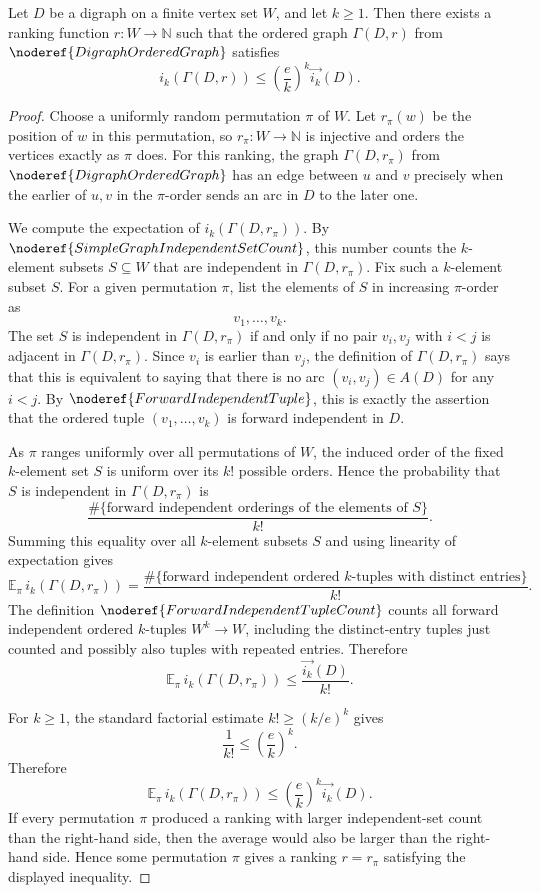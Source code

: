 \begin{helper}
Let \(D\) be a digraph on a finite vertex set \(W\), and let \(k\ge1\). Then there exists a ranking function \(r:W\to\mathbb N\) such that the ordered graph \(\Gamma(D,r)\) from \(\noderef{DigraphOrderedGraph}\) satisfies
\[
  i_k(\Gamma(D,r))
  \le
  \left(\frac e k\right)^k\overrightarrow{i_k}(D).
\]
\end{helper}
\begin{proof}
Choose a uniformly random permutation \(\pi\) of \(W\). Let \(r_\pi(w)\) be the position of \(w\) in this permutation, so \(r_\pi:W\to\mathbb N\) is injective and orders the vertices exactly as \(\pi\) does. For this ranking, the graph \(\Gamma(D,r_\pi)\) from \(\noderef{DigraphOrderedGraph}\) has an edge between \(u\) and \(v\) precisely when the earlier of \(u,v\) in the \(\pi\)-order sends an arc in \(D\) to the later one.

We compute the expectation of \(i_k(\Gamma(D,r_\pi))\). By \(\noderef{SimpleGraphIndependentSetCount}\), this number counts the \(k\)-element subsets \(S\subseteq W\) that are independent in \(\Gamma(D,r_\pi)\). Fix such a \(k\)-element subset \(S\). For a given permutation \(\pi\), list the elements of \(S\) in increasing \(\pi\)-order as
\[
  v_1,\ldots,v_k.
\]
The set \(S\) is independent in \(\Gamma(D,r_\pi)\) if and only if no pair \(v_i,v_j\) with \(i<j\) is adjacent in \(\Gamma(D,r_\pi)\). Since \(v_i\) is earlier than \(v_j\), the definition of \(\Gamma(D,r_\pi)\) says that this is equivalent to saying that there is no arc \((v_i,v_j)\in A(D)\) for any \(i<j\). By \(\noderef{ForwardIndependentTuple}\), this is exactly the assertion that the ordered tuple \((v_1,\ldots,v_k)\) is forward independent in \(D\).

As \(\pi\) ranges uniformly over all permutations of \(W\), the induced order of the fixed \(k\)-element set \(S\) is uniform over its \(k!\) possible orders. Hence the probability that \(S\) is independent in \(\Gamma(D,r_\pi)\) is
\[
  \frac{\#\{\text{forward independent orderings of the elements of }S\}}{k!}.
\]
Summing this equality over all \(k\)-element subsets \(S\) and using linearity of expectation gives
\[
  \mathbb E_\pi\, i_k(\Gamma(D,r_\pi))
  =
  \frac{\#\{\text{forward independent ordered \(k\)-tuples with distinct entries}\}}{k!}.
\]
The definition \(\noderef{ForwardIndependentTupleCount}\) counts all forward independent ordered \(k\)-tuples \(W^k\to W\), including the distinct-entry tuples just counted and possibly also tuples with repeated entries. Therefore
\[
  \mathbb E_\pi\, i_k(\Gamma(D,r_\pi))
  \le
  \frac{\overrightarrow{i_k}(D)}{k!}.
\]

For \(k\ge1\), the standard factorial estimate \(k!\ge(k/e)^k\) gives
\[
  \frac{1}{k!}\le \left(\frac e k\right)^k.
\]
Therefore
\[
  \mathbb E_\pi\, i_k(\Gamma(D,r_\pi))
  \le
  \left(\frac e k\right)^k\overrightarrow{i_k}(D).
\]
If every permutation \(\pi\) produced a ranking with larger independent-set count than the right-hand side, then the average would also be larger than the right-hand side. Hence some permutation \(\pi\) gives a ranking \(r=r_\pi\) satisfying the displayed inequality.
\end{proof}
